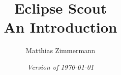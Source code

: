 
\author{Matthias Zimmermann}
\title{
\Huge\bf Eclipse Scout\\
\Large An Introduction
}
\ifpdf
  \isodate
\fi
\date{\emph{Version of \today}}
\maketitle

